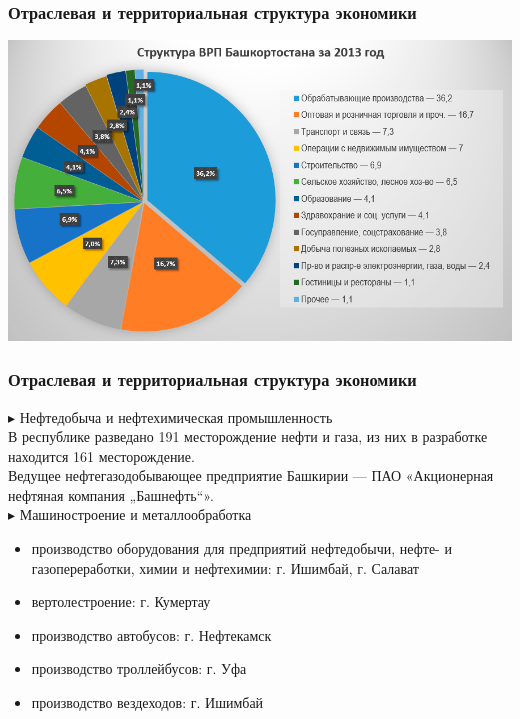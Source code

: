 \begin{frame}
\frametitle{Отраслевая и территориальная структура экономики}

\includegraphics[width=1\linewidth]{pics/sasha/vrp} 

\end{frame}

\begin{frame}
\frametitle{Отраслевая и территориальная структура экономики}

$\blacktriangleright$ Нефтедобыча и нефтехимическая промышленность\\[2pt]

В республике разведано 191 месторождение нефти и газа, из них в разработке находится 161 месторождение. \\[2pt]
Ведущее нефтегазодобывающее предприятие Башкирии — ПАО «Акционерная нефтяная компания „Башнефть“». \\[5pt]

$\blacktriangleright$ Машиностроение и металлообработка
\begin{itemize}
\item производство оборудования для предприятий нефтедобычи, нефте- и газопереработки, химии и нефтехимии: г. Ишимбай, г. Салават
\item вертолестроение: г. Кумертау
\item производство автобусов: г. Нефтекамск 
\item производство троллейбусов: г. Уфа 
\item производство вездеходов: г. Ишимбай
\end{itemize}

\end{frame}

